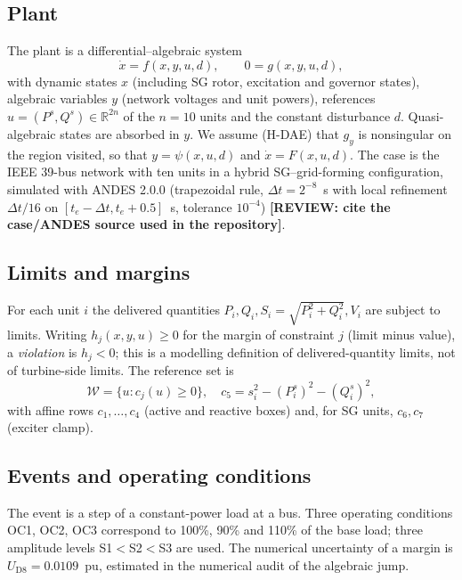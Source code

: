 \documentclass[11pt,twocolumn]{article}
\newcommand{\todo}[1]{\textbf{[REVIEW: #1]}}
\newcommand{\UD}{U_{\mathrm{D8}}}
\begin{document}
\subsection{Plant}
The plant is a differential--algebraic system
\begin{equation}
\dot x=f(x,y,u,d),\qquad 0=g(x,y,u,d),
\label{eq:dae}
\end{equation}
with dynamic states $x$ (including SG rotor, excitation and governor states), algebraic variables $y$ (network voltages and unit powers), references $u=(P^s,Q^s)\in\mathbb R^{2n}$ of the $n=10$ units and the constant disturbance $d$. Quasi-algebraic states are absorbed in $y$. We assume (H-DAE) that $g_y$ is nonsingular on the region visited, so that $y=\psi(x,u,d)$ and $\dot x=F(x,u,d)$. The case is the IEEE 39-bus network with ten units in a hybrid SG--grid-forming configuration, simulated with ANDES 2.0.0 (trapezoidal rule, $\Delta t=2^{-8}$~s with local refinement $\Delta t/16$ on $[t_e-\Delta t,t_e+0.5]$~s, tolerance $10^{-4}$) \cite{Kavvathas2025Resilient}\todo{cite the case/ANDES source used in the repository}.

\subsection{Limits and margins}
For each unit $i$ the delivered quantities $P_i,Q_i,S_i=\sqrt{P_i^2+Q_i^2},V_i$ are subject to limits. Writing $h_j(x,y,u)\ge 0$ for the margin of constraint $j$ (limit minus value), a \emph{violation} is $h_j<0$; this is a modelling definition of delivered-quantity limits, not of turbine-side limits. The reference set is
\begin{equation}
\mathcal W=\{u:c_j(u)\ge0\},\quad c_5=s_i^2-(P_i^s)^2-(Q_i^s)^2,
\label{eq:W}
\end{equation}
with affine rows $c_1,\dots,c_4$ (active and reactive boxes) and, for SG units, $c_6,c_7$ (exciter clamp).

\subsection{Events and operating conditions}
The event is a step of a constant-power load at a bus. Three operating conditions OC1, OC2, OC3 correspond to 100\%, 90\% and 110\% of the base load; three amplitude levels S1$<$S2$<$S3 are used. The numerical uncertainty of a margin is $\UD=0.0109$~pu, estimated in the numerical audit of the algebraic jump.
\end{document}
